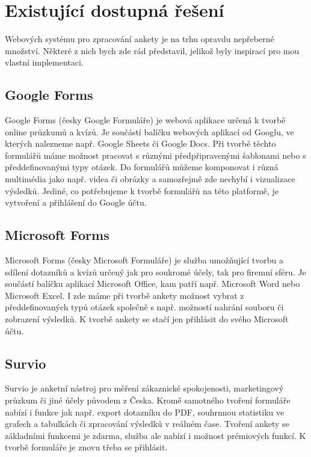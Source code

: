 \chapter{Existující dostupná řešení}

Webových systému pro zpracování ankety je na trhu opravdu nepřeberné množství. Některé z nich bych zde rád představil, jelikož byly inspirací pro mou vlastní implementaci.

\section{Google Forms}

Google Forms (česky Google Formuláře) je webová aplikace určená k tvorbě online průzkumů a kvízů. Je součástí balíčku webových aplikací od Googlu, ve kterých nalezneme např. Google Sheets či Google Docs. Při tvorbě těchto formulářů máme možnost pracovat s různými předpřipravenými šablonami nebo s předdefinovanými typy otázek. Do formulářů můžeme komponovat i různá multimédia jako např. videa či obrázky a samozřejmě zde nechybí i vizualizace výsledků. Jediné, co potřebujeme k tvorbě formulářů na této platformě, je vytvoření a přihlášení do Google účtu. \cite{GoogleForms1}\cite{GoogleForms2}

\section{Microsoft Forms}
Microsoft Forms (česky Microsoft Formuláře) je služba umožňující tvorbu a sdílení dotazníků a kvízů určený jak pro soukromé účely, tak pro firemní sféru. Je součástí balíčku aplikací Microsoft Office, kam patří např. Microsoft Word nebo Microsoft Excel. I zde máme při tvorbě ankety možnost vybrat z předdefinovaných typů otázek společně s např. možností nahrání souboru či zobrazení výsledků. K tvorbě ankety se stačí jen přihlásit do svého Microsoft účtu. \cite{MSForms1} \cite{MSForms2}

\section{Survio}
Survio je anketní nástroj pro měření zákaznické spokojenosti, marketingový průzkum či jiné účely původem z Česka. Kromě samotného tvoření formuláře nabízí i funkce jak např. export dotazníku do PDF, souhrnnou statistiku ve grafech a tabulkách či zpracování výsledků v reálném čase. Tvoření ankety se základními funkcemi je zdarma, služba ale nabízí i možnost prémiových funkcí. K tvorbě formuláře je znovu třeba se přihlásit. \cite{Survio}

